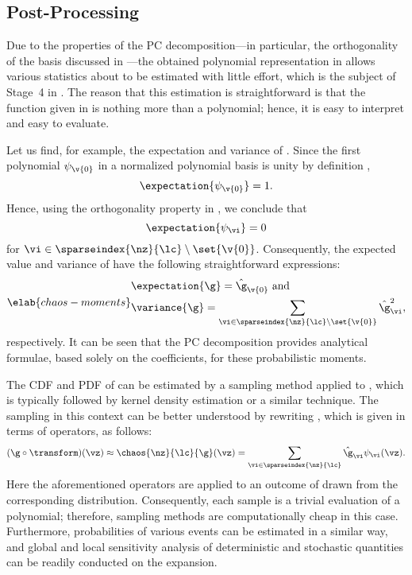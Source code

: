 \subsection{Post-Processing}

Due to the properties of the \ac{PC} decomposition---in particular, the
orthogonality of the basis discussed in ---the obtained
polynomial representation in  allows various statistics
about \g to be estimated with little effort, which is the subject of Stage~4 in
. The reason that this estimation is straightforward is
that the function given in  is nothing more than a
polynomial; hence, it is easy to interpret and easy to evaluate.

Let us find, for example, the expectation and variance of \g. Since the first
polynomial $\psi_{\v{0}}$ in a normalized polynomial basis is unity by
definition \cite{xiu2010},
\[
  \expectation{\psi_{\v{0}}} = 1.
\]
Hence, using the orthogonality property in , we
conclude that
\[
  \expectation{\psi_{\vi}} = 0
\]
for $\vi \in \sparseindex{\nz}{\lc} \setminus \set{\v{0}}$. Consequently, the
expected value and variance of \g have the following straightforward
expressions:
\begin{equation} \elab{chaos-moments}
  \begin{split}
    & \expectation{\g} = \hat{\g}_{\v{0}} \text{ and} \\
    & \variance{\g} = \sum_{\vi \in \sparseindex{\nz}{\lc} \setminus \set{\v{0}}} \hat{\g}_{\vi}^2,
  \end{split}
\end{equation}
respectively. It can be seen that the \ac{PC} decomposition provides analytical
formulae, based solely on the coefficients, for these probabilistic moments.

The \ac{CDF} and \ac{PDF} of \g can be estimated by a sampling method applied to
, which is typically followed by kernel density estimation
\cite{hastie2013} or a similar technique. The sampling in this context can be
better understood by rewriting , which is given in terms
of operators, as follows:
\[
  (\g \circ \transform)(\vz) \approx \chaos{\nz}{\lc}{\g}(\vz)
  = \sum_{\vi \in \sparseindex{\nz}{\lc}} \hat{\g}_{\vi} \psi_{\vi}(\vz).
\]
Here the aforementioned operators are applied to an outcome of \vz drawn from
the corresponding distribution. Consequently, each sample is a trivial
evaluation of a polynomial; therefore, sampling methods are computationally
cheap in this case. Furthermore, probabilities of various events can be
estimated in a similar way, and global and local sensitivity analysis of
deterministic and stochastic quantities can be readily conducted on the
expansion.


